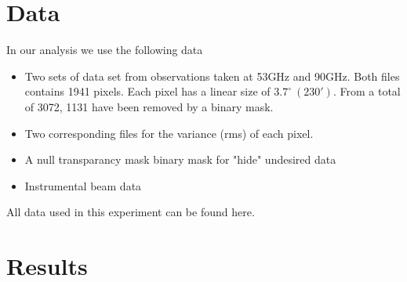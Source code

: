 \documentclass{emulateapj}
\begin{document}


\section{Data}
\label{sec:data}
  In our analysis we use the following data
\begin{itemize}
\item Two sets of data set from observations taken at 53GHz and 90GHz. Both files contains 1941 pixels. Each pixel has a linear size of $3.7^\circ \ (230')$. From a total of 3072, 1131 have been removed by a binary mask.
\item Two corresponding files for the variance (rms) of each pixel.
\item A null transparancy mask binary mask for "hide" undesired data
\item Instrumental beam data
\end{itemize}

All data used in this experiment can be found here.




\section{Results}
\label{sec:results}



\end{document}
